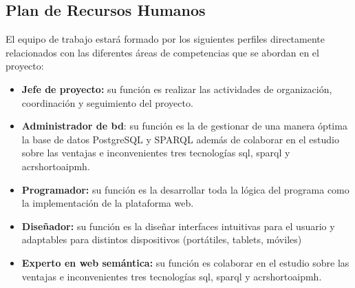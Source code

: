 \subsection{Plan de Recursos Humanos}\label{sec:planRecursosHumanos}

El equipo de trabajo estará formado por los siguientes perfiles directamente relacionados con las diferentes áreas de competencias que se abordan en el proyecto: 

\begin{itemize}
	\item \textbf{Jefe de proyecto:} su función es realizar las actividades de organización, coordinación y seguimiento del proyecto.
	\item \textbf{Administrador de \acrlong{bd}}: su función es la de gestionar de una manera óptima la base de datos PostgreSQL y SPARQL además de colaborar en el estudio sobre las ventajas e inconvenientes tres tecnologías \acrshort{sql}, \acrshort{sparql} y acrshort{oaipmh}. 
	\item \textbf{Programador:} su función es la desarrollar toda la lógica del programa como la implementación de la plataforma web. 
	\item \textbf{Diseñador:} su función es la diseñar interfaces intuitivas para el usuario y adaptables para distintos dispositivos (portátiles, tablets, móviles) 
	\item \textbf{Experto en web semántica:} su función es colaborar en el estudio sobre las ventajas e inconvenientes tres tecnologías \acrshort{sql}, \acrshort{sparql} y acrshort{oaipmh}.
\end{itemize}